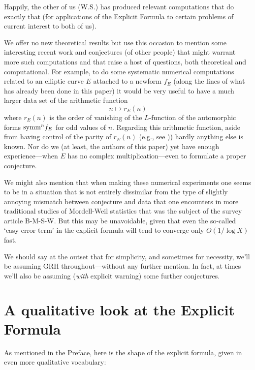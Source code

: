 \documentclass[11pt]{article}
\theoremstyle{plain}
\theoremstyle{definition}
\numberwithin{equation}{section}
\numberwithin{figure}{section}
\numberwithin{table}{section}
\begin{document}
 Happily, the other of us (W.S.) has produced relevant computations that do exactly that (for applications of the Explicit Formula to certain problems of current interest to both of us).%

 We offer no new theoretical results but use this occasion to mention some interesting recent work and conjectures  (of other people)  that might warrant more such computations and that raise a host of questions, both theoretical and computational.   For example, to do some systematic numerical computations related to an elliptic curve $E$ attached to a newform $f_E$  (along the lines of what has already been done in this paper)  it would be very useful to have a much larger data set  of the arithmetic function  $$n \mapsto r_E(n)$$
 where $r_E(n)$ is the order of vanishing of the $L$-function of the automorphic forms ${\rm symm}^n f_E$ for odd values of $n$.  Regarding this arithmetic function, aside from having control of the parity of   $r_E(n)$  (e.g., see \cite{DMW}))  hardly anything else is known. Nor do we (at least, the authors of this paper)  yet have enough experience---when $E$ has no complex multiplication---even to formulate a proper conjecture.

 We might also mention that when making these numerical experiments one seems to be in a situation  that is not entirely dissimilar from the type of slightly annoying mismatch between conjecture and data that one encounters in more traditional studies of Mordell-Weil statistics  that was the subject of the survey article B-M-S-W.  But this may be unavoidable, given that even  the so-called  `easy error term' in the explicit formula will tend to converge  only $O(1/\log X)$ fast.

 We should say at the outset that for simplicity, and sometimes for necessity, we'll be assuming GRH throughout---without any further mention. In fact, at times we'll also be assuming ({\it with} explicit warning) some further conjectures.


 \section{A qualitative look at the Explicit Formula}
 As mentioned in the Preface, here is the shape of the explicit formula, given in even more qualitative vocabulary:
\end{document}
